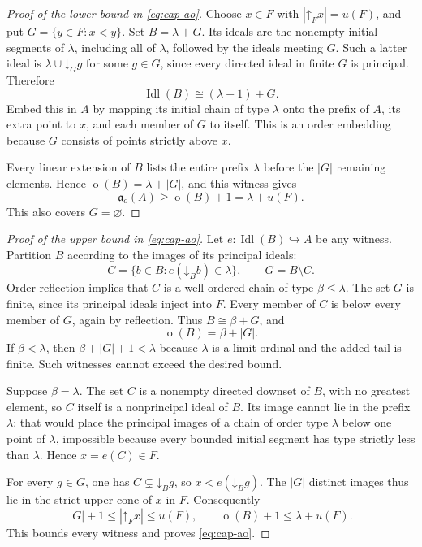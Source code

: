 \documentclass[11pt,letterpaper]{article}
\theoremstyle{teal}
\theoremstyle{definition}
\newcommand{\Idl}{\operatorname{Idl}}
\newcommand{\mot}{\operatorname{o}}
\newcommand{\ao}{\mathfrak a_o}
\newcommand{\emb}{\hookrightarrow}
\newcommand{\up}{\mathord\uparrow}
\newcommand{\dn}{\mathord\downarrow}
\begin{document}
\begin{proof}[Proof of the lower bound in \eqref{eq:cap-ao}]
Choose $x\in F$ with $|\up_Fx|=u(F)$, and put $G=\{y\in F:x<y\}$. Set $B=\lambda+G$. Its ideals are the nonempty initial segments of $\lambda$, including all of $\lambda$, followed by the ideals meeting $G$. Such a latter ideal is $\lambda\cup\dn_G g$ for some $g\in G$, since every directed ideal in finite $G$ is principal. Therefore
\[
 \Idl(B)\cong(\lambda+1)+G.
\]
Embed this in $A$ by mapping its initial chain of type $\lambda$ onto the prefix of $A$, its extra point to $x$, and each member of $G$ to itself. This is an order embedding because $G$ consists of points strictly above $x$.

Every linear extension of $B$ lists the entire prefix $\lambda$ before the $|G|$ remaining elements. Hence $\mot(B)=\lambda+|G|$, and this witness gives
\[
 \ao(A)\geq\mot(B)+1=\lambda+u(F).
\]
This also covers $G=\varnothing$.
\end{proof}

\begin{proof}[Proof of the upper bound in \eqref{eq:cap-ao}]
Let $e:\Idl(B)\emb A$ be any witness. Partition $B$ according to the images of its principal ideals:
\[
 C=\{b\in B:e(\dn_Bb)\in\lambda\},\qquad G=B\setminus C.
\]
Order reflection implies that $C$ is a well-ordered chain of type $\beta\leq\lambda$. The set $G$ is finite, since its principal ideals inject into $F$. Every member of $C$ is below every member of $G$, again by reflection. Thus $B\cong\beta+G$, and
\[
 \mot(B)=\beta+|G|.
\]
If $\beta<\lambda$, then $\beta+|G|+1<\lambda$ because $\lambda$ is a limit ordinal and the added tail is finite. Such witnesses cannot exceed the desired bound.

Suppose $\beta=\lambda$. The set $C$ is a nonempty directed downset of $B$, with no greatest element, so $C$ itself is a nonprincipal ideal of $B$. Its image cannot lie in the prefix $\lambda$: that would place the principal images of a chain of order type $\lambda$ below one point of $\lambda$, impossible because every bounded initial segment has type strictly less than $\lambda$. Hence $x=e(C)\in F$.

For every $g\in G$, one has $C\subsetneq\dn_Bg$, so $x<e(\dn_Bg)$. The $|G|$ distinct images thus lie in the strict upper cone of $x$ in $F$. Consequently
\[
 |G|+1\leq|\up_Fx|\leq u(F),
 \qquad \mot(B)+1\leq\lambda+u(F).
\]
This bounds every witness and proves \eqref{eq:cap-ao}.
\end{proof}
\end{document}
